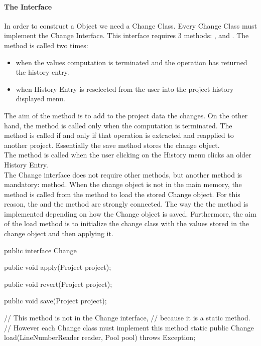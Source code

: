 \paragraph{The Interface} In order to construct a  Object we need a Change Class. Every Change Class must implement the Change Interface. This interface requires 3 methods: ,  and . The  method is called two times: 
\begin{itemize}
	\item when the values computation is terminated and the operation has returned the history entry.
	\item when History Entry is reselected from the user into the project history displayed menu.
\end{itemize}
The aim of the  method is to add to the project data the changes.
On the other hand, the  method is called only when the computation is terminated. The  method is called if and only if that operation is extracted and reapplied to another project. Essentially the save method stores the change object. \\
The  method is called when the user clicking on the History menu clicks an older History Entry. \\
The Change interface does not require other methods, but another method is mandatory:  method. When the change object is not in the main memory, the  method is called from the  method to load the stored Change object. For this reason, the  and the  method are strongly connected. The way the the  method is implemented depending on how the Change object is saved. Furthermore, the aim of the load method is to initialize the change class with the values stored in the change object and then applying it.\\
\begin{code}
public interface Change {

   public void apply(Project project);
   
   public void revert(Project project);

   public void save(Project project);
}

// This method is not in the Change interface,
// because it is a static method.
// However each Change class must implement this method
static public Change load(LineNumberReader reader, 
                          Pool pool) throws Exception;

\end{code}

